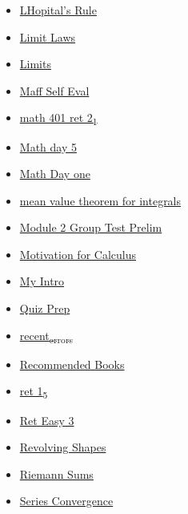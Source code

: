 \documentclass[11pt]{article}
\begin{document}
\begin{itemize}
\begin{itemize}
\begin{itemize}
\item \href{mathematics/single\_variable\_calculus/eRefLHopitalRule.org}{LHopital's Rule}
\item \href{mathematics/single\_variable\_calculus/KBhMATH401LimitLaws.org}{Limit Laws}
\item \href{mathematics/single\_variable\_calculus/KBhMATH401Limits.org}{Limits}
\item \href{mathematics/single\_variable\_calculus/KBxMaffSSelfEval.org}{Maff Self Eval}
\item \href{mathematics/single\_variable\_calculus/KBe20math401ret2\_1.org}{math 401 ret 2\textsubscript{1}}
\item \href{mathematics/single\_variable\_calculus/KBe20math401flo5.org}{Math day 5}
\item \href{mathematics/single\_variable\_calculus/KB20200824094500.org}{Math Day one}
\item \href{mathematics/single\_variable\_calculus/KBrefMeanValueTheoremForIntegrals.org}{mean value theorem for integrals}
\item \href{mathematics/single\_variable\_calculus/KBe20math401retModule2GroupTestPrelim.org}{Module 2 Group Test Prelim}
\item \href{mathematics/single\_variable\_calculus/KBe2020math401floCalcMotivation.org}{Motivation for Calculus}
\item \href{mathematics/single\_variable\_calculus/KBe2020math401ret0MyIntro.org}{My Intro}
\item \href{mathematics/single\_variable\_calculus/KBe21math401refQuizPrep.org}{Quiz Prep}
\item \href{mathematics/single\_variable\_calculus/recent\_errors.org}{recent\textsubscript{errors}}
\item \href{mathematics/single\_variable\_calculus/KBe2020math401refRecommendedBooks.org}{Recommended Books}
\item \href{mathematics/single\_variable\_calculus/KBe20math401ret1\_5.org}{ret 1\textsubscript{5}}
\item \href{mathematics/single\_variable\_calculus/KBe20math401retLight3.org}{Ret Easy 3}
\item \href{mathematics/single\_variable\_calculus/KBrefRevolvingShapes.org}{Revolving Shapes}
\item \href{mathematics/single\_variable\_calculus/KBrefRiemannSums.org}{Riemann Sums}
\item \href{mathematics/single\_variable\_calculus/KBhMATH401SeriesConvergence.org}{Series Convergence}

\end{itemize}
\end{itemize}
\end{itemize}
\end{document}
